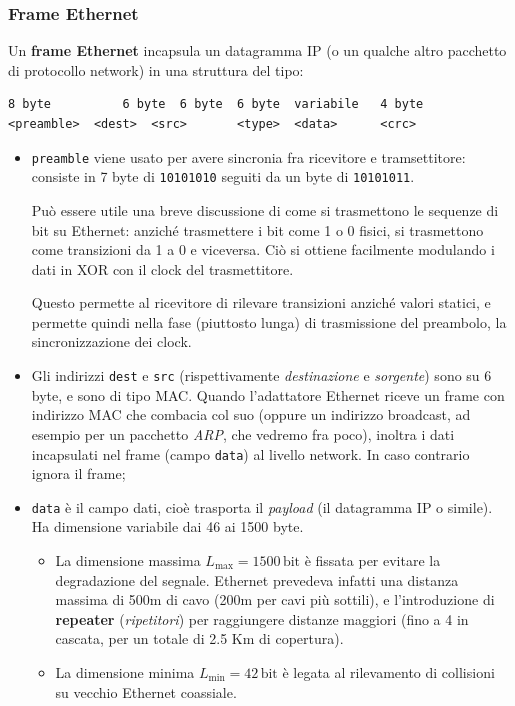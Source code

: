 \documentclass[a4paper,11pt]{article}
\begin{document}
\subsubsection{Frame Ethernet}
Un \textbf{frame Ethernet} incapsula un datagramma IP (o un qualche altro pacchetto di protocollo network) in una struttura del tipo:
\begin{lstlisting}[style=codestyle]
8 byte			6 byte	6 byte	6 byte	variabile	4 byte
<preamble>	<dest>	<src>		<type>	<data>		<crc>
\end{lstlisting}
\begin{itemize}
	\item \lstinline|preamble| viene usato per avere sincronia fra ricevitore e tramsettitore: consiste in 7 byte di \lstinline|10101010| seguiti da un byte di \lstinline|10101011|.

	Può essere utile una breve discussione di come si trasmettono le sequenze di bit su Ethernet: anziché trasmettere i bit come 1 o 0 fisici, si trasmettono come transizioni da 1 a 0 e viceversa. Ciò si ottiene facilmente modulando i dati in XOR con il clock del trasmettitore.

		Questo permette al ricevitore di rilevare transizioni anziché valori statici, e permette quindi nella fase (piuttosto lunga) di trasmissione del preambolo, la sincronizzazione dei clock.
		
	\item Gli indirizzi \lstinline|dest| e \lstinline|src| (rispettivamente \textit{destinazione} e \textit{sorgente}) sono su 6 byte, e sono di tipo MAC. Quando l'adattatore Ethernet riceve un frame con indirizzo MAC che combacia col suo (oppure un indirizzo broadcast, ad esempio per un pacchetto \textit{ARP}, che vedremo fra poco), inoltra i dati incapsulati nel frame (campo \lstinline|data|) al livello network. In caso contrario ignora il frame;
	\item \lstinline|data| è il campo dati, cioè trasporta il \textit{payload} (il datagramma IP o simile). Ha dimensione variabile dai 46 ai 1500 byte. 

		\begin{itemize}
			\item La dimensione massima $L_\text{max} = 1500 \, \text{bit}$ è fissata per evitare la degradazione del segnale. Ethernet prevedeva infatti una distanza massima di 500m di cavo (200m per cavi più sottili), e l'introduzione di \textbf{repeater} (\textit{ripetitori}) per raggiungere distanze maggiori (fino a 4 in cascata, per un totale di 2.5 Km di copertura).
			\item La dimensione minima $L_\text{min} = 42 \, \text{bit}$ è legata al rilevamento di collisioni su vecchio Ethernet coassiale.


\end{itemize}
\end{itemize}
\end{document}
